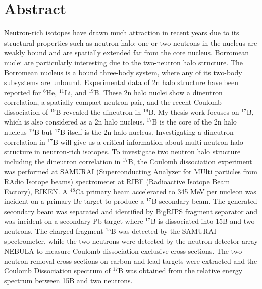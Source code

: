 \documentclass[11pt]{book}
\begin{document}
\chapter*{Abstract}
Neutron-rich isotopes have drawn much attraction in recent years due to its structural properties such as neutron halo: one or two neutrons in the nucleus are weakly bound and are spatially extended far from the core nucleus. Borromean nuclei are particularly interesting due to the two-neutron halo structure. The Borromean nucleus is a bound three-body system, where any of its two-body subsystems are unbound. Experimental data of 2n halo structure have been reported for ${}^{6}$He, ${}^{11}$Li, and ${}^{19}$B. These 2n halo nuclei show a dineutron correlation, a spatially compact neutron pair, and the recent Coulomb dissociation of ${}^{19}$B revealed the dineutron in ${}^{19}$B. My thesis work focuses on ${}^{17}$B, which is also considered as a 2n halo nucleus. ${}^{17}$B is the core of the 2n halo nucleus ${}^{19}$B but ${}^{17}$B itself is the 2n halo nucleus. Investigating a dineutron correlation in ${}^{17}$B will give us a critical information about multi-neutron halo structure in neutron-rich isotopes. \newline
To investigate two neutron halo structure including the dineutron correlation in ${}^{17}$B, the Coulomb dissociation experiment was performed at SAMURAI (Superconducting Analyzer for MUlti particles from RAdio Isotope beams) spectrometer at RIBF (Radioactive Isotope Beam Factory), RIKEN. A $^{48}$Ca primary beam accelerated to 345 MeV per nucleon was incident on a primary Be target to produce a ${}^{17}$B secondary beam. The generated secondary beam was separated and identified by BigRIPS fragment separator and was incident on a secondary Pb target where ${}^{17}$B is dissociated into 15B and two neutrons. The charged fragment $^{15}$B was detected by the SAMURAI spectrometer, while the two neutrons were detected by the neutron detector array NEBULA to measure Coulomb dissociation exclusive cross sections. The two neutron removal cross sections on carbon and lead targets were extracted and the Coulomb Dissociation spectrum of ${}^{17}$B was obtained from the relative energy spectrum between 15B and two neutrons.

\clearpage

\tableofcontents
\listoffigures
\listoftables

\mainmatter %

\end{document}
